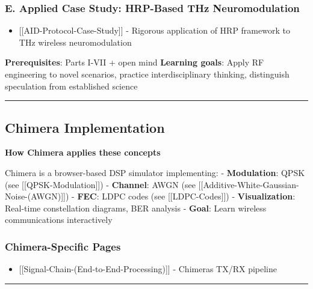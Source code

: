 \subsubsection{E. Applied Case Study: HRP-Based THz
Neuromodulation}\label{e.-applied-case-study-hrp-based-thz-neuromodulation}

\begin{itemize}
\tightlist
\item
  {[}{[}AID-Protocol-Case-Study{]}{]} - Rigorous application of HRP
  framework to THz wireless neuromodulation
\end{itemize}

\textbf{Prerequisites}: Parts I-VII + open mind \textbf{Learning goals}:
Apply RF engineering to novel scenarios, practice interdisciplinary
thinking, distinguish speculation from established science

\begin{center}\rule{0.5\linewidth}{0.5pt}\end{center}

\subsection{\texorpdfstring{ Chimera
Implementation}{ Chimera Implementation}}\label{chimera-implementation}

\textbf{How Chimera applies these concepts}

Chimera is a browser-based DSP simulator implementing: -
\textbf{Modulation}: QPSK (see {[}{[}QPSK-Modulation{]}{]}) -
\textbf{Channel}: AWGN (see
{[}{[}Additive-White-Gaussian-Noise-(AWGN){]}{]}) - \textbf{FEC}: LDPC
codes (see {[}{[}LDPC-Codes{]}{]}) - \textbf{Visualization}: Real-time
constellation diagrams, BER analysis - \textbf{Goal}: Learn wireless
communications interactively

\subsubsection{Chimera-Specific Pages}\label{chimera-specific-pages}

\begin{itemize}
\tightlist
\item
  {[}{[}Signal-Chain-(End-to-End-Processing){]}{]} -
  Chimera\textquotesingle s TX/RX pipeline
\end{itemize}

\begin{center}\rule{0.5\linewidth}{0.5pt}\end{center}

